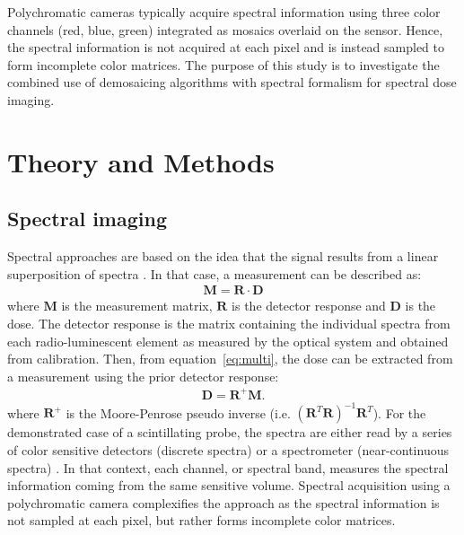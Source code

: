 \documentclass[12pt]{iopart}
\begin{document}
Polychromatic cameras typically acquire spectral information using three color channels (red, blue, green) integrated as mosaics overlaid on the sensor. Hence, the spectral information is not acquired at each pixel and is instead sampled to form incomplete color matrices. The purpose of this study is to investigate the combined use of demosaicing algorithms with spectral formalism for spectral dose imaging. 

\section{Theory and Methods}
\subsection{Spectral imaging}
Spectral approaches are based on the idea that the signal results from a linear superposition of spectra \cite{archambault_mathematical_2012}. In that case, a measurement can be described as:
\begin{align}
\boldsymbol{M} = \boldsymbol{R}\cdot \boldsymbol{D} 
\label{eq:multi}
\end{align}
where $\boldsymbol{M}$ is the measurement matrix, $\boldsymbol{R}$ is the detector response and $\boldsymbol{D}$ is the dose. The detector response is the matrix containing the individual spectra from each radio-luminescent element as measured by the optical system and obtained from calibration. Then, from equation~\ref{eq:multi}, the dose can be extracted from a measurement using the prior detector response:
\begin{align}
    \boldsymbol{D} = \boldsymbol{R}^+\boldsymbol{M}.
\end{align}
where $\boldsymbol{R}^+$ is the Moore-Penrose pseudo inverse (i.e. $(\boldsymbol{R}^T \boldsymbol{R})^{-1}\boldsymbol{R}^T$). For the demonstrated case of a scintillating probe, the spectra are either read by a series of color sensitive detectors (discrete spectra) \cite{linares_rosales_optimization_2019} or a spectrometer (near-continuous spectra) \cite{therriault-proulx_development_2012, Jean_2021}. In that context, each channel, or spectral band, measures the spectral information coming from the same sensitive volume. Spectral acquisition using a polychromatic camera complexifies the approach as the spectral information is not sampled at each pixel, but rather forms incomplete color matrices.
\end{document}
